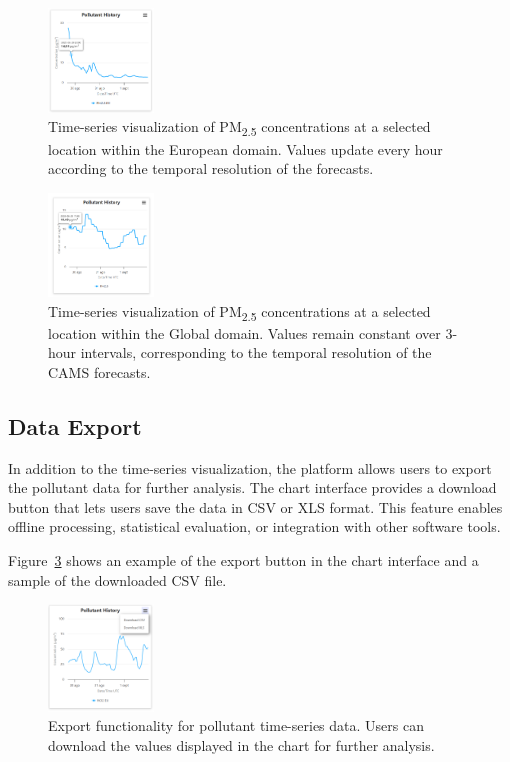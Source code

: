 \begin{figure}[h]
	\centering
	\includegraphics[width=0.25\textwidth]{fig/timeseries-europe.PNG}
	\caption{Time-series visualization of PM\textsubscript{2.5} concentrations at a selected location within the European domain. Values update every hour according to the temporal resolution of the forecasts.}
	\label{fig:timeseries-europe}
\end{figure}

\begin{figure}[h]
	\centering
	\includegraphics[width=0.25\textwidth]{fig/timeseries-global.PNG}
	\caption{Time-series visualization of PM\textsubscript{2.5} concentrations at a selected location within the Global domain. Values remain constant over 3-hour intervals, corresponding to the temporal resolution of the CAMS forecasts.}
	\label{fig:timeseries-global}
\end{figure}


\subsection{Data Export}

In addition to the time-series visualization, the platform allows users to export the pollutant data for further analysis. The chart interface provides a download button that lets users save the data in CSV or XLS format. This feature enables offline processing, statistical evaluation, or integration with other software tools.

Figure~\ref{fig:data-export} shows an example of the export button in the chart interface and a sample of the downloaded CSV file.

\begin{figure}[h]
	\centering
	\includegraphics[width=0.25\textwidth]{fig/data-export.png}
	\caption{Export functionality for pollutant time-series data. Users can download the values displayed in the chart for further analysis.}
	\label{fig:data-export}
\end{figure}



